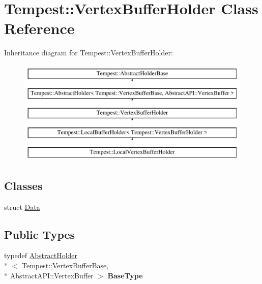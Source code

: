 \hypertarget{class_tempest_1_1_vertex_buffer_holder}{\section{Tempest\+:\+:Vertex\+Buffer\+Holder Class Reference}
\label{class_tempest_1_1_vertex_buffer_holder}
}
Inheritance diagram for Tempest\+:\+:Vertex\+Buffer\+Holder\+:\begin{figure}[H]
\begin{center}
\leavevmode
\includegraphics[height=5.000000cm]{class_tempest_1_1_vertex_buffer_holder}
\end{center}
\end{figure}
\subsection*{Classes}
\begin{DoxyCompactItemize}
\item 
struct \hyperlink{struct_vertex_buffer_holder_1_1_data}{Data}
\end{DoxyCompactItemize}
\subsection*{Public Types}
\begin{DoxyCompactItemize}
\item 
\hypertarget{class_tempest_1_1_vertex_buffer_holder_a482f97418bac504d341456617a877b6e}{typedef \hyperlink{class_tempest_1_1_abstract_holder}{Abstract\+Holder}\\*
$<$ \hyperlink{class_tempest_1_1_vertex_buffer_base}{Tempest\+::\+Vertex\+Buffer\+Base}, \\*
Abstract\+A\+P\+I\+::\+Vertex\+Buffer $>$ {\bfseries Base\+Type}}\label{class_tempest_1_1_vertex_buffer_holder_a482f97418bac504d341456617a877b6e}

\end{DoxyCompactItemize}
